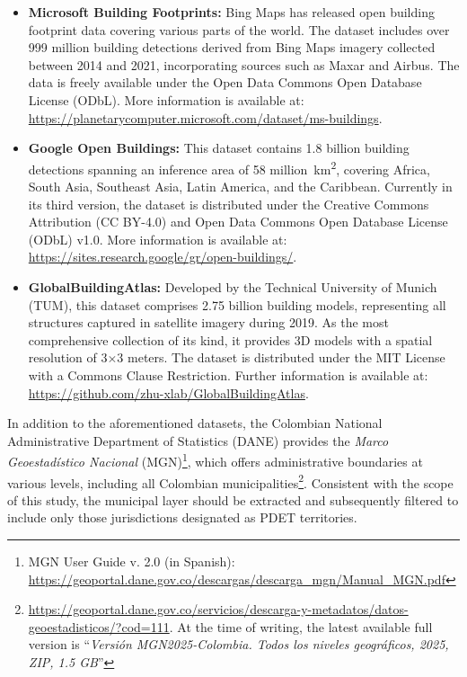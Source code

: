 \documentclass[12pt]{article}
\begin{document}
\begin{itemize}
  \item \textbf{Microsoft Building Footprints:} Bing Maps has released open building footprint data covering various parts of the world. The dataset includes over 999 million building detections derived from Bing Maps imagery collected between 2014 and 2021, incorporating sources such as Maxar and Airbus. The data is freely available under the Open Data Commons Open Database License (ODbL). More information is available at: \url{https://planetarycomputer.microsoft.com/dataset/ms-buildings}.

  \item \textbf{Google Open Buildings:} This dataset contains 1.8 billion building detections spanning an inference area of 58 million~km\textsuperscript{2}, covering Africa, South Asia, Southeast Asia, Latin America, and the Caribbean. Currently in its third version, the dataset is distributed under the Creative Commons Attribution (CC BY-4.0) and Open Data Commons Open Database License (ODbL) v1.0. More information is available at: \url{https://sites.research.google/gr/open-buildings/}.

  \item \textbf{GlobalBuildingAtlas:} Developed by the Technical University of Munich (TUM), this dataset comprises 2.75 billion building models, representing all structures captured in satellite imagery during 2019. As the most comprehensive collection of its kind, it provides 3D models with a spatial resolution of 3$\times$3 meters. The dataset is distributed under the MIT License with a Commons Clause Restriction. Further information is available at: \url{https://github.com/zhu-xlab/GlobalBuildingAtlas}.

\end{itemize}

In addition to the aforementioned datasets, the Colombian National Administrative Department of Statistics (DANE) provides the \textit{Marco Geoestadístico Nacional} (MGN)\footnote{MGN User Guide v. 2.0 (in Spanish): \url{https://geoportal.dane.gov.co/descargas/descarga_mgn/Manual_MGN.pdf}}, which offers administrative boundaries at various levels, including all Colombian municipalities\footnote{\url{https://geoportal.dane.gov.co/servicios/descarga-y-metadatos/datos-geoestadisticos/?cod=111}. At the time of writing, the latest available full version is ``\textit{Versión MGN2025-Colombia. Todos los niveles geográficos, 2025, ZIP, 1.5 GB}''}. Consistent with the scope of this study, the municipal layer should be extracted and subsequently filtered to include only those jurisdictions designated as PDET territories.
\end{document}
